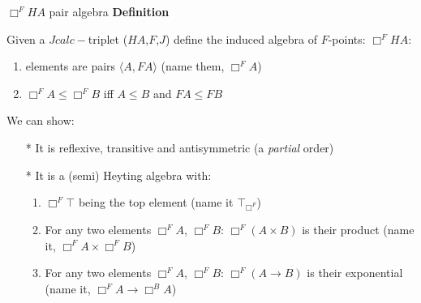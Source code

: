 \documentclass{beamer}
\begin{document}
\begin{frame}{$\Box^F HA$ pair algebra}
  \textbf{Definition}
  
Given a $Jcalc-$triplet ($HA$,$F$,$J$)  define the induced algebra of $F$-points:
$\Box^F HA$:
\begin{enumerate}
\item elements are pairs  $\langle A,FA\rangle$ (name them, $\Box^F A$)
\item $\Box^F A\le \Box^F B$ iff $ A\le B$ and $FA\le FB$ 
\end{enumerate}
We can show:
\begin{itemize}
  \item[*] It is reflexive, transitive and antisymmetric (a \textit{partial} order)
  \item[*] It is a (semi) Heyting algebra with:
  \begin{enumerate}
    \item $\Box^F \top$ being the top element (name it $\top_{\Box^F}$)
    \item For any two elements $\Box^F A$, $\Box^F B$: 
    $\Box^F (A\times B)$ is their product (name it, $\Box^{F} A\times\Box^{F} B$)
    \item For any two elements $\Box^F A$, $\Box^F B$:
    $\Box^F (A\rightarrow B)$ is their exponential 
    (name it, $\Box^F A\rightarrow\Box^B A$)
  \end{enumerate}
\end{itemize}
\end{frame}
\end{document}
